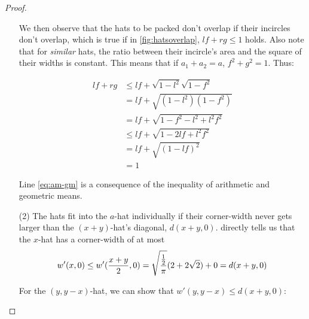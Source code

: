 \documentclass[%
    a4paper,              %
    style=print,          %
    bibliography=totoc,   %
    nexus,                %
    lnum,                 %
    extramargin,          %
]{tubsbook}
\begin{document}
\begin{proof}
\begin{itemize}
            We then observe that the hats to be packed don't overlap if their incircles don't overlap, which is true if in \cref{fig:hatsoverlap}, $lf + rg \le 1$ holds. Also note that for \emph{similar} hats, the ratio between their incircle's area and the square of their widths is constant. This means that if $a_1 + a_2 = a$, $f^2 + g^2 = 1$. Thus:

            \begin{align*}
                lf + rg
                &\le lf + \sqrt{1-l^2} \sqrt{1-f^2}\\
                &= lf + \sqrt{(1-l^2)(1-f^2)}\\
                &= lf + \sqrt{1 - f^2 - l^2 + l^2f^2}\\
                &\le lf + \sqrt{1 - 2lf + l^2f^2}\tag{\theequation}\label{eq:am-gm}\\
                &= lf + \sqrt{(1-lf)^2}\\
                &= 1
            \end{align*}

            Line \ref{eq:am-gm} is a consequence of the inequality of arithmetic and geometric means.

        \item[(2)]
            The hats fit into the $a$-hat individually if their corner-width never gets larger than the $(x+y)$-hat's diagonal, $d(x+y,0)$.
             directly tells us that the $x$-hat has a corner-width of at most
            \begin{align*}
                w'(x,0) \le w'(\frac{x+y}{2},0) = \sqrt{\frac{\frac{1}{2}}{\pi}}(2+2\sqrt{2}) + 0 = d(x+y,0)
            \end{align*}

            For the $(y,y-x)$-hat, we can show that $w'(y,y-x) \le d(x+y,0)$: 

    \end{itemize}
\end{proof}
\end{document}
